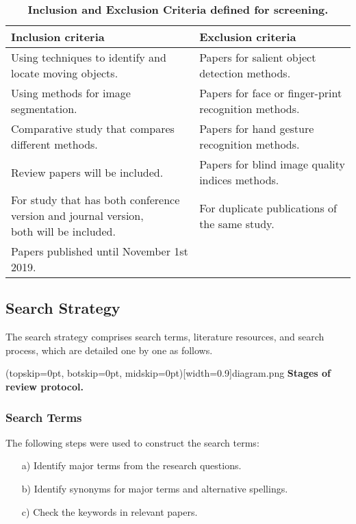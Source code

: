 \documentclass[two column]{ieeeaccess}
\begin{document}
\begin{table*}[h!]
\begin{center}
\caption{\textbf{Inclusion and Exclusion Criteria defined for screening.}}
\begin{tabular}{l|l}
\hline
        Inclusion criteria                                      &   Exclusion criteria     \\ 
\hline
        Using techniques to identify and locate moving objects. &   Papers for salient object detection methods.  \\

        Using methods for image segmentation.                   &   Papers for face or finger-print recognition methods.\\

        Comparative study that compares different methods.      &   Papers for hand gesture recognition methods.\\
        
        Review papers will be included.                         &   Papers for blind image quality indices methods.\\
        
        \makecell{For study that has both conference version and journal version,\\ both will be included.}                                                              & For duplicate publications of the same study.\\
        
        Papers published until November 1st 2019.               & \\
\hline
\end{tabular}
\end{center}
\end{table*}

\subsection{Search Strategy}
The search strategy comprises search terms, literature resources, and search process, which are detailed one by one as follows.

\Figure[t!](topskip=0pt, botskip=0pt, midskip=0pt)[width=0.9\linewidth]{diagram.png}
{\textbf{Stages of review protocol.}\label{fig11}}

\subsubsection{Search Terms}
The following steps were used to construct the search terms:
\begin{itemize}

    \item[a)]Identify major terms from the research questions.
    
    \item[b)]Identify synonyms for major terms and alternative spellings.
    
    \item[c)]Check the keywords in relevant papers.
    
\end{itemize}
\end{document}
